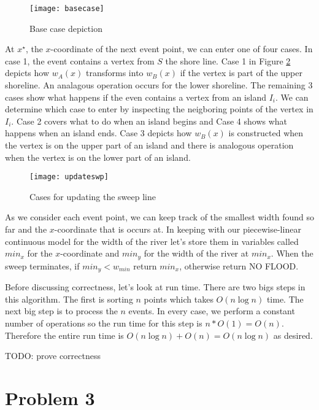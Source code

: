 \documentclass[11pt]{article}
\begin{document}
\begin{figure}[h]
    \centering
    \texttt{[image: basecase]}
    \caption{Base case depiction}
    \label{fig:basecase}
\end{figure}

At $x^\star$, the $x$-coordinate of the next event point, we can enter one of four cases.
In case 1, the event contains a vertex from $S$ the shore line.
Case 1 in Figure \ref{fig:updateswp} depicts how $w_A(x)$ transforms into $w_B(x)$ if the vertex is part of the upper shoreline.
An analagous operation occurs for the lower shoreline.
The remaining 3 cases show what happens if the even contains a vertex from an island $I_i$.
We can determine which case to enter by inspecting the neigboring points of the vertex in $I_i$.
Case 2 covers what to do when an island begins and Case 4 shows what happens when an island ends.
Case 3 depicts how $w_B (x)$ is constructed when the vertex is on the upper part of an island and there is analogous operation when the vertex is on the lower part of an island.

\begin{figure}[h]
    \centering
    \texttt{[image: updateswp]}
    \caption{Cases for updating the sweep line}
    \label{fig:updateswp}
\end{figure}

As we consider each event point, we can keep track of the smallest width found so far and the $x$-coordinate that is occurs at.
In keeping with our piecewise-linear continuous model for the width of the river let's store them in variables called $min_x$ for the $x$-coordinate and $min_y$ for the width of the river at $min_x$.
When the sweep terminates, if $min_y < w_{min}$ return $min_x$, otherwise return NO FLOOD.

Before discussing correctness, let's look at run time.
There are two bigs steps in this algorithm.
The first is sorting $n$ points which takes $O(n \log n)$ time.
The next big step is to process the $n$ events.
In every case, we perform a constant number of operations so the run time for this step is $n * O(1) = O(n)$.
Therefore the entire run time is $O(n \log n) + O(n) = O(n \log n)$ as desired.

TODO: prove correctness

\newpage
\section*{Problem 3}
\end{document}
